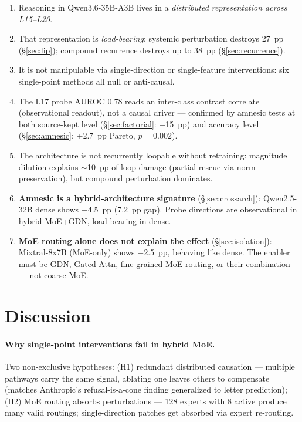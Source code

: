 \documentclass[11pt]{article}
\begin{document}
\begin{enumerate}[leftmargin=*, topsep=0pt]
  \item Reasoning in Qwen3.6-35B-A3B lives in a \emph{distributed representation across L15--L20}.
  \item That representation is \emph{load-bearing}: systemic perturbation destroys 27~pp (\S\ref{sec:lip}); compound recurrence destroys up to 38~pp (\S\ref{sec:recurrence}).
  \item It is not manipulable via single-direction or single-feature interventions: six single-point methods all null or anti-causal.
  \item The L17 probe AUROC 0.78 reads an inter-class contrast correlate (observational readout), not a causal driver --- confirmed by amnesic tests at both source-kept level (\S\ref{sec:factorial}: +15~pp) and accuracy level (\S\ref{sec:amnesic}: +2.7~pp Pareto, $p=0.002$).
  \item The architecture is not recurrently loopable without retraining: magnitude dilution explains $\sim$10~pp of loop damage (partial rescue via norm preservation), but compound perturbation dominates.
  \item \textbf{Amnesic is a hybrid-architecture signature} (\S\ref{sec:crossarch}): Qwen2.5-32B dense shows $-$4.5~pp (7.2~pp gap). Probe directions are observational in hybrid MoE+GDN, load-bearing in dense.
  \item \textbf{MoE routing alone does not explain the effect} (\S\ref{sec:isolation}): Mixtral-8x7B (MoE-only) shows $-$2.5~pp, behaving like dense. The enabler must be GDN, Gated-Attn, fine-grained MoE routing, or their combination --- not coarse MoE.
\end{enumerate}

\section{Discussion}

\paragraph{Why single-point interventions fail in hybrid MoE.} Two non-exclusive hypotheses: (H1) redundant distributed causation --- multiple pathways carry the same signal, ablating one leaves others to compensate (matches Anthropic's refusal-is-a-cone finding generalized to letter prediction); (H2) MoE routing absorbs perturbations --- 128 experts with 8 active produce many valid routings; single-direction patches get absorbed via expert re-routing.
\end{document}
